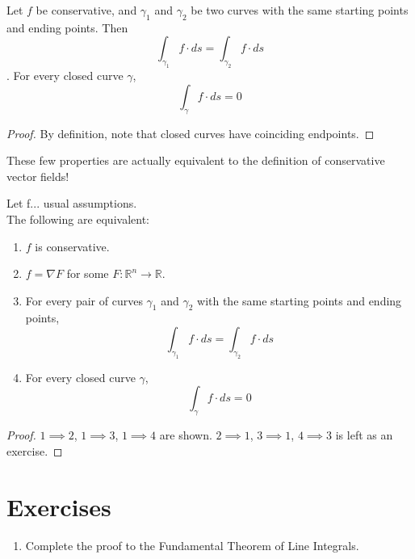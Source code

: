 \documentclass[11pt,openany]{book}
\newcommand*{\exercises}{\section*{\exercisename}}
\newcommand{\exercisename}{Exercises}
\newcommand{\proposition}[1]{\begin{tcolorbox}[title=Proposition,colframe=gray]{#1}\end{tcolorbox}
}
\newcommand{\theorem}[2]{\begin{tcolorbox}[title=Theorem ({#1}),colframe=red!70!black,colback=red!5!white]{#2}\end{tcolorbox}
}
\begin{document}
	\proposition{
	Let $f$ be conservative, and $\gamma_1$ and $\gamma_2$ be two curves with the same starting points and ending points. Then \[
		\int_{\gamma_1} f \cdot ds = \int_{\gamma_2} f \cdot ds
	\].
	For every closed curve $\gamma$,
	\[
	\int_\gamma f\cdot ds = 0
	\]
	}
	
	\begin{proof}
		By definition, note that closed curves have coinciding endpoints.
	\end{proof}
	These few properties are actually equivalent to the definition of conservative vector fields!
	\theorem{Fundamental Theorem of Line Integrals}{
		Let f... usual assumptions.\\
		The following are equivalent:
		\begin{enumerate}
			\item $f$ is conservative.
			\item $f = \nabla F$ for some $F:\mathbb{R}^n \to \mathbb{R}$.
			\item For every pair of curves $\gamma_1$ and $\gamma_2$ with the same starting points and ending points, \[
			\int_{\gamma_1} f \cdot ds = \int_{\gamma_2} f \cdot ds
			\]
			\item For every closed curve $\gamma$,
			\[
			\int_\gamma f\cdot ds = 0
			\]
		\end{enumerate}
	}
	\begin{proof}
		$1 \implies 2$, $1 \implies 3$, $1 \implies 4$ are shown. $2 \implies 1$, $3 \implies 1$, $4 \implies 3$ is left as an exercise. 
	\end{proof}
	\exercises
	\begin{enumerate}
		\item Complete the proof to the Fundamental Theorem of Line Integrals.
	\end{enumerate}
	
\end{document}
